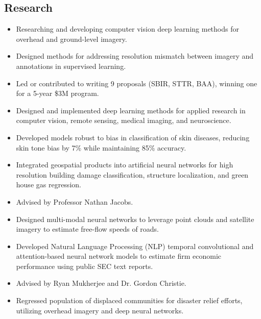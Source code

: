 \documentclass[11pt,a4paper,sans]{moderncv} %
\begin{document}
\subsection{Research}
{
\begin{itemize} 
	\item Researching and developing computer vision deep learning methods for overhead and ground-level imagery.
	\item Designed methods for addressing resolution mismatch between imagery and annotations in supervised learning.
	\item Led or contributed to writing 9 proposals (SBIR, STTR, BAA), winning one for a 5-year \$3M program.
\end{itemize}
}
{
\begin{itemize} 
	\item Designed and implemented deep learning methods for applied research in computer vision, remote sensing, medical imaging, and neuroscience.
	\item Developed models robust to bias in classification of skin diseases, reducing skin tone bias by 7\% while maintaining 85\% accuracy.
	\item Integrated geospatial products into artificial neural networks for high resolution building damage classification, structure localization, and green house gas regression.  
\end{itemize}
}
{
\begin{itemize} 
	\item Advised by Professor Nathan Jacobs.
	\item Designed multi-modal neural networks to leverage point clouds and satellite imagery to estimate free-flow speeds of roads.
	\item Developed Natural Language Processing (NLP) temporal convolutional and attention-based neural network models to estimate firm economic performance using public SEC text reports. 
\end{itemize}
}
{
\begin{itemize} 
	\item Advised by Ryan Mukherjee and Dr. Gordon Christie.
	\item Regressed population of displaced communities for disaster relief efforts, utilizing overhead imagery and deep neural networks.
\end{itemize}
}
\end{document}
